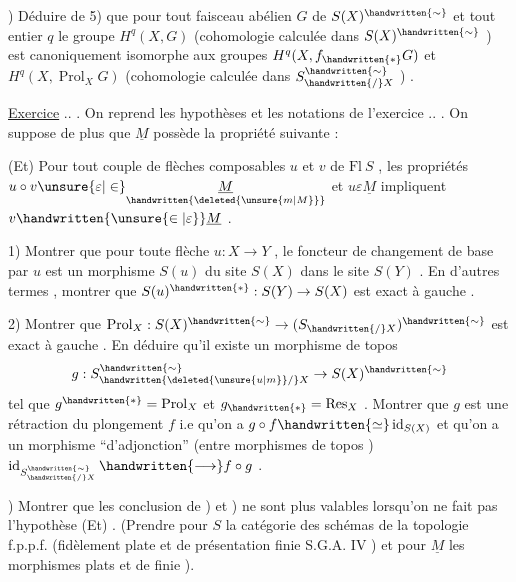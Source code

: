 ) Déduire de 5) que pour tout faisceau abélien \(G\)  de \(S(X)^{\handwritten{\sim}}\) et tout entier \(q\) le groupe \(H^q(X,G)\)  (cohomologie calculée dans \(S(X)^{\handwritten{\sim}}\) ) est canoniquement isomorphe aux groupes \(H^q(X,f_{\handwritten{*}}G)\) et \(H^q(X,\operatorname{Prol}_X G)\) (cohomologie calculée dans \(S^{\handwritten{\sim}}_{\handwritten{/}X}\) ) .

\uline{Exercice} .. . On reprend les hypothèses et les notations de l'exercice .. . On suppose de plus que \(\underline{M}\) possède la propriété suivante :

(Et) Pour tout couple de flèches composables \(u\) et \(v\) de \(\mathrm{Fl}\ S\) , les  propriétés \(u\circ v\unsure{\varepsilon|\in}\underset{\handwritten{\deleted{\unsure{m|M}}}}{\underline{M}}\) et \(u\varepsilon\underline{M}\) impliquent \(v\handwritten{\unsure{\in|\varepsilon}}\underline{M}\) .

1) Montrer que pour toute flèche \(u:X\to Y\) , le foncteur de changement de base par \(u\) est un morphisme  \(S(u)\) du site \(S(X)\) dans le site \(S(Y)\) . En d'autres termes , montrer que \(S(u)^{\handwritten{*}}:S(Y)\to S(X)\) est exact à gauche .

2) Montrer que \(\operatorname{Prol}_X:S(X)^{\handwritten{\sim}}\to(S_{\handwritten{/}X})^{\handwritten{\sim}}\) est exact à gauche . En déduire qu'il existe un morphisme de topos
\[
g:S^{\handwritten{\sim}}_{\handwritten{\deleted{\unsure{u|m}}/}X}\to S(X)^{\handwritten{\sim}}
\]
tel que \(g^{\handwritten{*}}=\operatorname{Prol}_X\) et \(g_{\handwritten{*}}=\operatorname{Res}_X\) . Montrer que \(g\) est une rétraction du plongement \(f\) i.e qu'on a \(g\circ f\handwritten{\simeq}\operatorname{id}_{S(X)}\) et qu'on a un morphisme ``d'adjonction'' (entre morphismes de topos ) \(\operatorname{id}_{S^{\handwritten{\sim}}_{\handwritten{/}X}}\handwritten{\longrightarrow} f\circ g\) .

) Montrer que les conclusion de ) et ) ne sont plus valables lorsqu'on ne fait pas l'hypothèse (Et) . (Prendre pour \(S\) la catégorie des schémas  de la topologie f.p.p.f. (fidèlement plate et de présentation finie \handwritten{[} S.G.A.  IV \handwritten{]} ) et pour \(\underline{M}\) les morphismes  plats et de  finie ).

